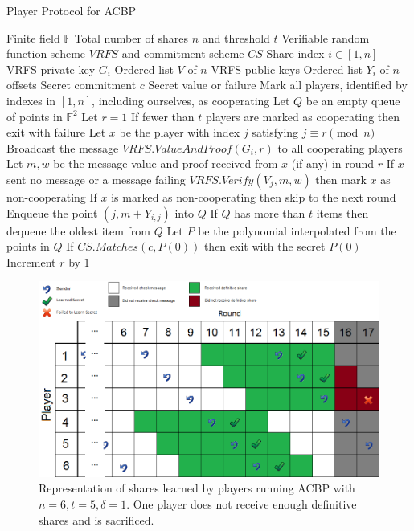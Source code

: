 \documentclass[12pt]{article}
\begin{document}
\begin{algorithm}
  \caption{Player Protocol for ACBP}
  \label{alg:ACBP:Player}
  \begin{algorithmic}
    \INPUT Finite field $\mathbb{F}$
    \INPUT Total number of shares $n$ and threshold $t$
    \INPUT Verifiable random function scheme $VRFS$ and commitment scheme $CS$
    \INPUT Share index $i \in [1, n]$
    \INPUT VRFS private key $G_i$
    \INPUT Ordered list $V$ of $n$ VRFS public keys
    \INPUT Ordered list $Y_i$ of $n$ offsets
    \INPUT Secret commitment $c$
    \OUTPUT Secret value or failure
    \STATE Mark all players, identified by indexes in $[1,n]$, including ourselves, as cooperating
    \STATE Let $Q$ be an empty queue of points in $\mathbb{F}^2$
    \STATE Let $r = 1$
	  \STATE If fewer than $t$ players are marked as cooperating then exit with failure
	  \STATE Let $x$ be the player with index $j$ satisfying $j \equiv r \pmod{n}$
	  	 \STATE Broadcast the message $VRFS.ValueAndProof(G_i, r)$ to all cooperating players
	  \ENDIF
	  \STATE Let $m, w$ be the message value and proof received from $x$ (if any) in round $r$
	  \STATE If $x$ sent no message or a message failing $VRFS.Verify(V_j, m, w)$ then mark $x$ as non-cooperating
	  \STATE If $x$ is marked as non-cooperating then skip to the next round
	  \STATE Enqueue the point $(j, m + Y_{i,j})$ into $Q$
      \STATE If $Q$ has more than $t$ items then dequeue the oldest item from $Q$
	   	\STATE Let $P$ be the polynomial interpolated from the points in $Q$
	    \STATE If $CS.Matches(c, P(0))$ then exit with the secret $P(0)$
	  \ENDIF
      \STATE Increment $r$ by $1$
	\ENDWHILE
  \end{algorithmic}
\end{algorithm}
\begin{figure}
\includegraphics[width=\textwidth]{../../Graphics/AsyncVerifiedSecret_n6t5d1.png}
\caption[Shares learned by players running ACBP]{Representation of shares learned by players running ACBP with $n=6, t=5, \delta=1$. One player does not receive enough definitive shares and is sacrificed.}
\label{img:ex:ACBP}
\end{figure}
\end{document}
